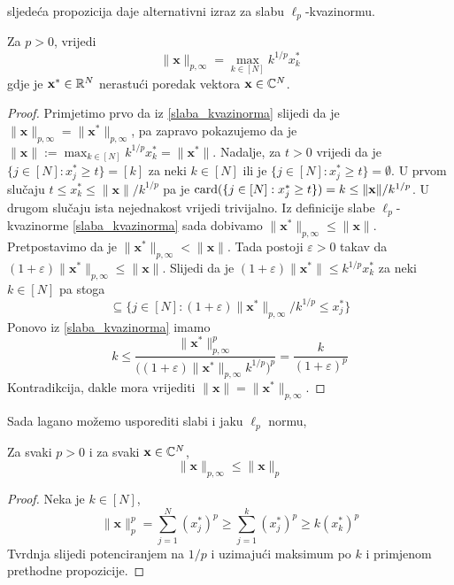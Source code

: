 \documentclass[a4paper,twoside,12pt]{memoir} %
\newcommand{\vect}[1]{\mathbf{#1}}
\renewcommand{\vec}{\vect}
\newcommand{\card}{\text{\normalfont{card}}}
\begin{document}
\noindent sljede\'ca propozicija daje alternativni izraz za slabu $\ell_p$-kvazinormu.
\begin{prop}\label{slaba_kvazinorma_2}
    Za $p>0$, vrijedi
    \begin{equation*}
        \|\vec{x}\|_{p, \infty} = \max \limits_{k \in [N]}k^{1/p}x_k^{*}
    \end{equation*}
    gdje je $\vec{x}^* \in \R^N$ nerastu\'ci poredak vektora $\vec{x}\in \C^N$.
\end{prop}
\begin{proof}
    Primjetimo prvo da iz \eqref{slaba_kvazinorma} slijedi da je $\|\vec{x}\|_{p, \infty}=\|\vec{x}^*\|_{p, \infty}$, pa zapravo pokazujemo da je $\|\vec{x}\|:= \max_{k \in [N]}k^{1/p}x_k^* = \|\vec{x}^*\|$. Nadalje, za $t>0$ vrijedi da je $\{j \in [N]: x^*_j \geq t\}=[k]$ za neki $k \in [N]$ ili je $\{j \in [N]: x^*_j \geq t\}=\emptyset$. U prvom slu\v{c}aju $t \leq x^*_k \leq \|\vec{x}\|/k^{1/p}$ pa je $\card(\{j \in [N]:x_j^* \geq t \}) = k \leq \|\vec{x}\|/k^{1/p}$. U drugom slu\v{c}aju ista nejednakost vrijedi trivijalno. Iz definicije slabe $\ell_p$-kvazinorme \eqref{slaba_kvazinorma} sada dobivamo $\|\vec{x}^*\|_{p, \infty} \leq \|\vec{x}\|$. Pretpostavimo da je $\|\vec{x}^*\|_{p, \infty} < \|\vec{x}\|$. Tada postoji $\varepsilon > 0$ takav da $(1+ \varepsilon)\|\vec{x}^*\|_{p, \infty} \leq \|\vec{x}\|$. Slijedi da je $(1 + \varepsilon)\|\vec{x}^*\| \leq  k^{1/p}x^*_k$ za neki $k \in [N]$ pa stoga
    \begin{equation*}
        [k] \subseteq \big\{ j \in [N] : (1 + \varepsilon)\|\vec{x}^*\|_{p, \infty}/k^{1/p} \leq x_j^* \big\}
    \end{equation*}
    Ponovo iz \eqref{slaba_kvazinorma} imamo
    \begin{equation*}
        k \leq \frac{\|\vec{x}^*\|^p_{p, \infty}}{\big( (1 + \varepsilon)\|\vec{x}^*\|_{p, \infty}k^{1/p}\big)^p}=\frac{k}{(1 + \varepsilon)^p}
    \end{equation*}
    Kontradikcija, dakle mora vrijediti $\|\vec{x}\| = \|\vec{x}^*\|_{p, \infty}$.
\end{proof}
\noindent Sada lagano mo\v{z}emo usporediti slabi i jaku $\ell_p$ normu,
\begin{prop}
    Za svaki $p > 0$ i za svaki $\vec{x} \in \C^N$,
    \begin{equation*}
        \|\vec{x}\|_{p, \infty} \leq \|\vec{x}\|_p
    \end{equation*}
\end{prop}
\begin{proof}
    Neka je $k \in [N]$,
    \begin{equation*}
        \|\vec{x}\|_p^p = \sum_{j=1}^{N}(x_j^*)^p \geq \sum_{j=1}^{k}(x_j^*)^p \geq k(x_k^*)^p
    \end{equation*}
    Tvrdnja slijedi potenciranjem na $1/p$ i uzimaju\'ci maksimum po $k$ i primjenom prethodne propozicije.
\end{proof}
\end{document}
